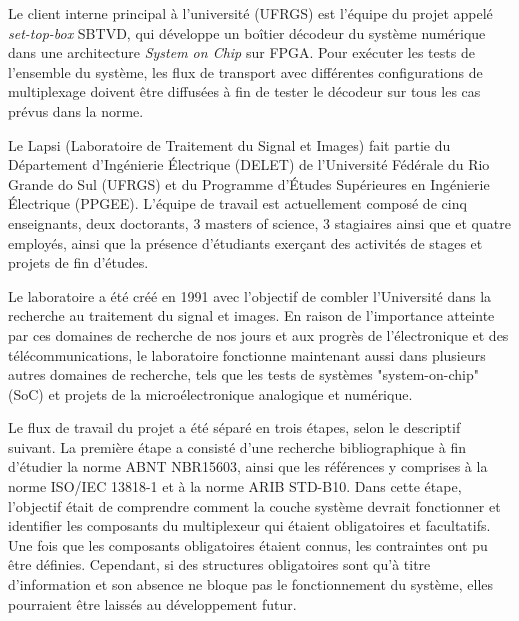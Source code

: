\documentclass[12pt,a4paper]{article}
\begin{document}
Le client interne principal à l'université (UFRGS) est l'équipe du projet appelé \textit{set-top-box} SBTVD, qui développe un boîtier décodeur du système numérique dans une architecture \textit{System on Chip} sur FPGA. Pour exécuter les tests de l'ensemble du système, les flux de transport avec différentes configurations de multiplexage doivent être diffusées à fin de tester le décodeur sur tous les cas prévus dans la norme.

Le Lapsi (Laboratoire de Traitement du Signal et Images) fait partie du Département d'Ingénierie Électrique (DELET) de l'Université Fédérale du Rio Grande do Sul (UFRGS) et du Programme d'Études Supérieures en Ingénierie Électrique (PPGEE). L'équipe de travail est actuellement composé de cinq enseignants, deux doctorants, 3 masters of science, 3 stagiaires ainsi que et quatre employés, ainsi que la présence d'étudiants exerçant des activités de stages et projets de fin d'études.

Le laboratoire a été créé en 1991 avec l'objectif de combler l'Université dans la recherche au traitement du signal et images. En raison de l'importance atteinte par ces domaines de recherche de nos jours et aux progrès de l'électronique et des télécommunications, le laboratoire fonctionne maintenant aussi dans plusieurs autres domaines de recherche, tels que les tests de systèmes "system-on-chip" (SoC) et projets de la microélectronique analogique et numérique.


Le flux de travail du projet a été séparé en trois étapes, selon le descriptif suivant. La première étape a consisté d'une recherche bibliographique à fin d'étudier la norme ABNT NBR15603, ainsi que les références y comprises à la norme ISO/IEC 13818-1 et à la norme ARIB STD-B10. Dans cette étape, l'objectif était de comprendre comment la couche système devrait fonctionner et identifier les composants du multiplexeur qui étaient obligatoires et facultatifs. Une fois que les composants obligatoires étaient connus, les contraintes ont pu être définies. Cependant, si des structures obligatoires sont qu'à titre d'information et son absence ne bloque pas le fonctionnement du système, elles pourraient être laissés au développement futur.
\end{document}
